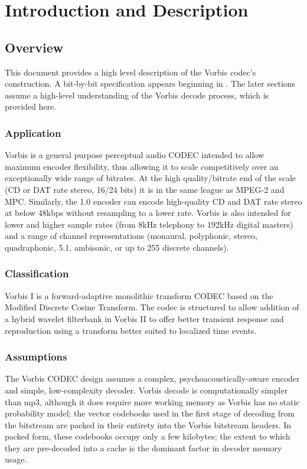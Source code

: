 \section{Introduction and Description} \label{vorbis:spec:intro}

\subsection{Overview}

This document provides a high level description of the Vorbis codec's
construction.  A bit-by-bit specification appears beginning in
.
The later sections assume a high-level
understanding of the Vorbis decode process, which is
provided here.

\subsubsection{Application}
Vorbis is a general purpose perceptual audio CODEC intended to allow
maximum encoder flexibility, thus allowing it to scale competitively
over an exceptionally wide range of bitrates.  At the high
quality/bitrate end of the scale (CD or DAT rate stereo, 16/24 bits)
it is in the same league as MPEG-2 and MPC.  Similarly, the 1.0
encoder can encode high-quality CD and DAT rate stereo at below 48kbps
without resampling to a lower rate.  Vorbis is also intended for
lower and higher sample rates (from 8kHz telephony to 192kHz digital
masters) and a range of channel representations (monaural,
polyphonic, stereo, quadraphonic, 5.1, ambisonic, or up to 255
discrete channels).


\subsubsection{Classification}
Vorbis I is a forward-adaptive monolithic transform CODEC based on the
Modified Discrete Cosine Transform.  The codec is structured to allow
addition of a hybrid wavelet filterbank in Vorbis II to offer better
transient response and reproduction using a transform better suited to
localized time events.


\subsubsection{Assumptions}

The Vorbis CODEC design assumes a complex, psychoacoustically-aware
encoder and simple, low-complexity decoder. Vorbis decode is
computationally simpler than mp3, although it does require more
working memory as Vorbis has no static probability model; the vector
codebooks used in the first stage of decoding from the bitstream are
packed in their entirety into the Vorbis bitstream headers. In
packed form, these codebooks occupy only a few kilobytes; the extent
to which they are pre-decoded into a cache is the dominant factor in
decoder memory usage.


